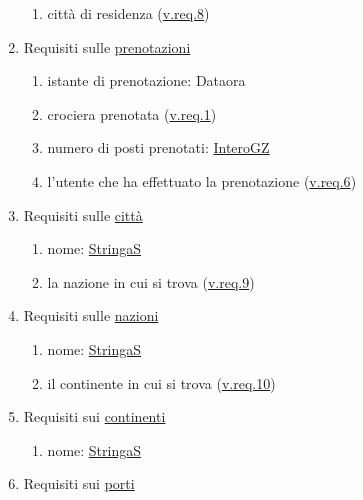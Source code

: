 \documentclass{article}
\begin{document}
\begin{enumerate}
\begin{enumerate}
        \item città di residenza (\hyperref[sec:RequisitiCittà]{v.req.8})\label{sec:RequisitiUtenteCittàDiResidenza}
    \end{enumerate}
    \item Requisiti sulle \hyperref[sec:Prenotazione]{prenotazioni}\label{sec:RequisitiPrenotazione}
    \begin{enumerate}
        \item istante di prenotazione: Dataora\label{sec:RequisitiPrenotazioneIstanteDiPrenotazione}
        \item crociera prenotata (\hyperref[sec:RequisitiCrociera]{v.req.1})\label{sec:RequisitiPrenotazioneCrocieraPrenotata}
        \item numero di posti prenotati: \hyperref[sec:InteroGZ]{InteroGZ}\label{sec:RequisitiPrenotazioneNumeroDiPostiPrenotati}
        \item l'utente che ha effettuato la prenotazione (\hyperref[sec:RequisitiUtente]{v.req.6})\label{sec:RequisitiPrenotazioneUtente}
    \end{enumerate}
    \item Requisiti sulle \hyperref[sec:Città]{città}\label{sec:RequisitiCittà}
    \begin{enumerate}
        \item nome: \hyperref[sec:StringaS]{StringaS}\label{sec:RequisitiCittàNome}
        \item la nazione in cui si trova (\hyperref[sec:RequisitiNazione]{v.req.9})\label{sec:RequisitiCittàNazione}
    \end{enumerate}
    \item Requisiti sulle \hyperref[sec:Nazione]{nazioni}\label{sec:RequisitiNazione}
    \begin{enumerate}
        \item nome: \hyperref[sec:StringaS]{StringaS}\label{sec:RequisitiNazioneNome}
        \item il continente in cui si trova (\hyperref[sec:RequisitiContinente]{v.req.10})\label{sec:RequisitiNazioneContinente}
    \end{enumerate}
    \item Requisiti sui \hyperref[sec:Continente]{continenti}\label{sec:RequisitiContinente}
    \begin{enumerate}
        \item nome: \hyperref[sec:StringaS]{StringaS}\label{sec:RequisitiContinenteNome}
    \end{enumerate}
    \item Requisiti sui \hyperref[sec:Porto]{porti}\label{sec:RequisitiPorto}

\end{enumerate}
\end{document}
